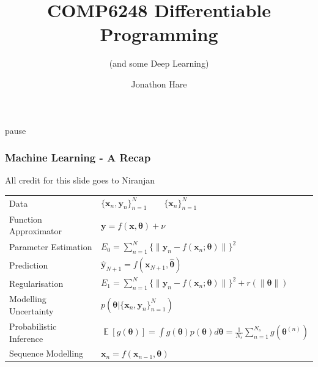 \documentclass[\beamerclass]{beamer}
\title[COMP6248 Deep Learning]{COMP6248 Differentiable Programming}
\subtitle{(and some Deep Learning)}
\author{Jonathon Hare}
\institute[]
{
  Vision, Learning and Control\\
  University of Southampton 
}
\date{}
\begin{document}
\begin{frame}[plain]
\end{frame}

\frame{
  \titlepage
}

\begin{frame}{pause}
\frametitle{Machine Learning - A Recap}
{\tiny All credit for this slide goes to Niranjan}\\
\vspace{5mm}
\begin{tabular}{ll}
Data & $\{\bm{x}_n, \bm{y}_n\}^N_{n=1} \qquad \{\bm{x}_n\}^N_{n=1}$ 
\vspace{3mm} \\ \pause
Function Approximator & $\bm{y} = f (\bm{x}, \bm{\theta}) + \nu$ 
\vspace{3mm} \\ \pause
Parameter Estimation & $E_0 = \sum^N_{n=1} \{\|\bm{y}_n - f (\bm{x}_n; \bm{\theta})\|\}^2$
\vspace{3mm} \\ \pause
Prediction & $\bm{\hat y}_{N+1} = f(\bm{x}_{N+1}, \bm{\hat \theta})$
\vspace{3mm} \\ \pause
Regularisation & $E_1 = \sum^N_{n=1} \{\|\bm{y}_n - f (\bm{x}_n; \bm{\theta})\|\}^2 + r(\|\bm\theta\|)$
\vspace{3mm} \\ \pause
Modelling Uncertainty & $p(\bm\theta|\{\bm x_n, \bm y_n\}_{n=1}^N)$
\vspace{3mm} \\ \pause
Probabilistic Inference & $\mathop{\mathbb{E}}[g(\bm\theta)] = \int g(\bm\theta)p(\bm\theta)d\bm\theta = \frac{1}{N_s}\sum_{n=1}^{N_s}g(\bm\theta^{(n)})$
\vspace{3mm} \\ \pause
Sequence Modelling & $\bm x_n = f(\bm x_{n-1}, \bm\theta)$
\end{tabular}
\vspace{5mm}
\end{frame}
\end{document}
